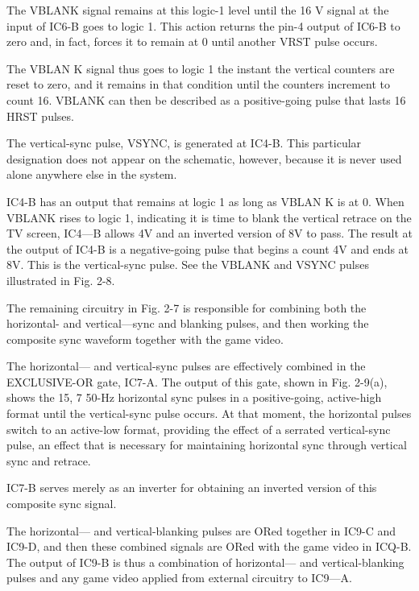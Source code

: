 \documentclass[11pt]{book}              %
\begin{document}
The VBLANK signal remains at this logic-1 level until the 16 V signal at the input of IC6-B goes to logic 1. This action returns the pin-4 output of IC6-B to zero and, in fact, forces it to remain at 0 until another VRST pulse occurs.

The VBLAN K signal thus goes to logic 1 the instant the vertical counters are reset to zero, and it remains in that condition until the counters increment to count 16. VBLANK can then be described as a positive-going pulse that lasts 16 HRST pulses.


The vertical-sync pulse, VSYNC, is generated at IC4-B. This particular designation does not appear on the schematic, however, because it is never used alone anywhere else in the system.

IC4-B has an output that remains at logic 1 as long as VBLAN K is at 0. When VBLANK rises to logic 1, indicating it is time to blank the vertical retrace on the TV screen, IC4—B allows 4V and an inverted version of 8V to pass. The result at the output of IC4-B is a negative-going pulse that begins a count 4V and ends at 8V. This is the vertical-sync pulse. See the VBLANK and VSYNC pulses illustrated in Fig. 2-8.

The remaining circuitry in Fig. 2-7 is responsible for combining both the horizontal- and vertical—sync and blanking pulses, and then working the composite sync waveform together with the game video.

The horizontal— and vertical-sync pulses are effectively combined in the EXCLUSIVE-OR gate, IC7-A. The output of this gate, shown in Fig. 2-9(a), shows the 15, 7 50-Hz horizontal sync pulses in a positive-going, active-high format until the vertical-sync pulse occurs. At that moment, the horizontal pulses switch to an active-low format, providing the effect of a serrated vertical-sync pulse, an effect that is necessary for maintaining horizontal sync through vertical sync and retrace.

IC7-B serves merely as an inverter for obtaining an inverted version of this composite sync signal.

The horizontal— and vertical-blanking pulses are ORed together in IC9-C and IC9-D, and then these combined signals are ORed with the game video in ICQ-B. The output of IC9-B is thus a combination of horizontal— and vertical-blanking pulses and any game video applied from external circuitry to IC9—A.
\end{document}

